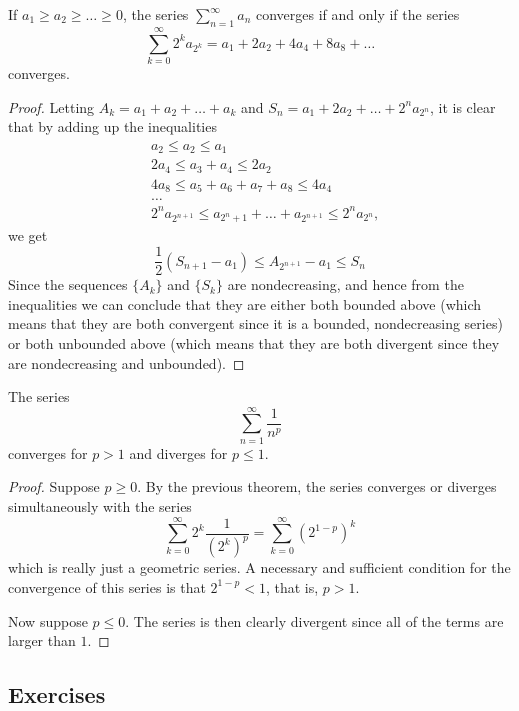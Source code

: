\documentclass{article}
\begin{document}
    \begin{theorem}[Cauchy]
    If $a_1 \geq a_2 \geq \ldots \geq 0$, the series $\sum_{n=1}^\infty a_n$ converges if and only if the series 
    \[\sum_{k=0}^\infty 2^k a_{2^k} = a_1 + 2 a_2 + 4a_4 + 8a_8 + \ldots \]
    converges. 
    \end{theorem}
    \begin{proof}
    Letting $A_k = a_1 + a_2 + \ldots + a_k$ and $S_n = a_1 + 2a_2 + \ldots + 2^n a_{2^n}$, it is clear that by adding up the inequalities
    \begin{align*}
        & a_2 \leq a_2 \leq a_1 \\
        & 2a_4 \leq a_3 + a_4 \leq 2a_2 \\
        & 4a_8 \leq a_5 + a_6 + a_7 + a_8 \leq 4a_4 \\
        & \ldots \\
        & 2^n a_{2^{n+1}} \leq a_{2^n + 1} + \ldots + a_{2^{n+1}} \leq 2^n a_{2^n}, 
    \end{align*}
    we get
    \[\frac{1}{2}(S_{n+1} - a_1) \leq A_{2^{n+1}} - a_1 \leq S_n\]
    Since the sequences $\{A_k\}$ and $\{S_k\}$ are nondecreasing, and hence from the inequalities we can conclude that they are either both bounded above (which means that they are both convergent since it is a bounded, nondecreasing series) or both unbounded above (which means that they are both divergent since they are nondecreasing and unbounded). 
    \end{proof}

    \begin{corollary}
    The series 
    \[\sum_{n=1}^\infty \frac{1}{n^p}\]
    converges for $p>1$ and diverges for $p \leq 1$. 
    \end{corollary}
    \begin{proof}
    Suppose $p\geq 0$. By the previous theorem, the series converges or diverges simultaneously with the series 
    \[\sum_{k=0}^\infty 2^k \frac{1}{(2^k)^p} = \sum_{k=0}^\infty (2^{1-p})^k\]
    which is really just a geometric series. A necessary and sufficient condition for the convergence of this series is that $2^{1-p} < 1$, that is, $p>1$. 

    Now suppose $p \leq 0$. The series is then clearly divergent since all of the terms are larger than $1$. 
    \end{proof}

  \subsection{Exercises}
\end{document}
